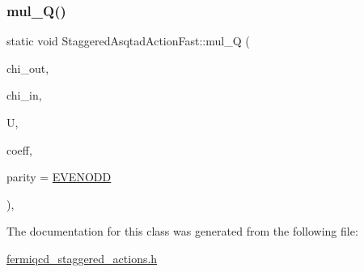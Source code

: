 \subsubsection{\texorpdfstring{mul\+\_\+\+Q()}{mul\_Q()}}
{\footnotesize\ttfamily static void Staggered\+Asqtad\+Action\+Fast\+::mul\+\_\+Q (\begin{DoxyParamCaption}\item[{\hyperlink{classstaggered__field}{staggered\+\_\+field} \&}]{chi\+\_\+out,  }\item[{\hyperlink{classstaggered__field}{staggered\+\_\+field} \&}]{chi\+\_\+in,  }\item[{\hyperlink{classgauge__field}{gauge\+\_\+field} \&}]{U,  }\item[{\hyperlink{classcoefficients}{coefficients} \&}]{coeff,  }\item[{int}]{parity = {\ttfamily \hyperlink{mdp__global__vars_8h_a4c9de81f2de5a74b588107b6c0afb9ee}{E\+V\+E\+N\+O\+DD}} }\end{DoxyParamCaption})\hspace{0.3cm}{\ttfamily [inline]}, {\ttfamily [static]}}



The documentation for this class was generated from the following file\+:\begin{DoxyCompactItemize}
\item 
\hyperlink{fermiqcd__staggered__actions_8h}{fermiqcd\+\_\+staggered\+\_\+actions.\+h}\end{DoxyCompactItemize}
